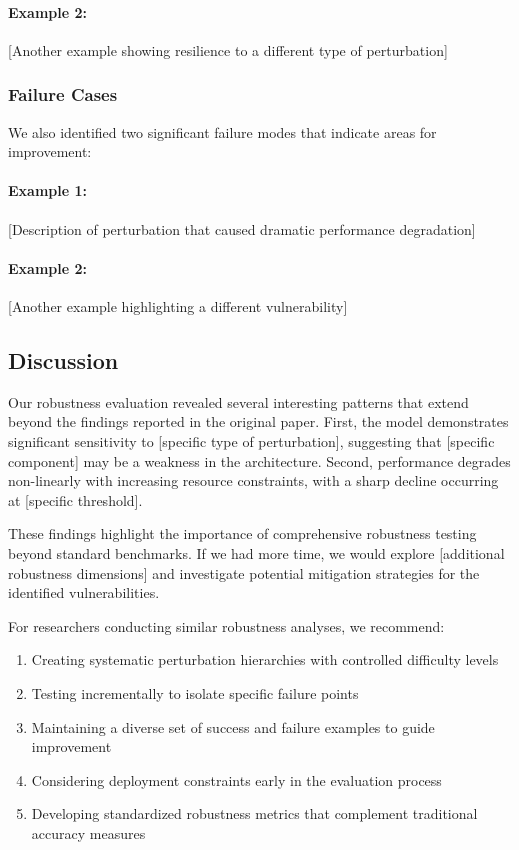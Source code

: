 \documentclass[11pt,a4paper]{article}
\begin{document}
\paragraph{Example 2:} [Another example showing resilience to a different type of perturbation]

\subsubsection{Failure Cases}

We also identified two significant failure modes that indicate areas for improvement:

\paragraph{Example 1:} [Description of perturbation that caused dramatic performance degradation]

\paragraph{Example 2:} [Another example highlighting a different vulnerability]

\subsection{Discussion}

Our robustness evaluation revealed several interesting patterns that extend beyond the findings reported in the original paper. First, the model demonstrates significant sensitivity to [specific type of perturbation], suggesting that [specific component] may be a weakness in the architecture. Second, performance degrades non-linearly with increasing resource constraints, with a sharp decline occurring at [specific threshold].

These findings highlight the importance of comprehensive robustness testing beyond standard benchmarks. If we had more time, we would explore [additional robustness dimensions] and investigate potential mitigation strategies for the identified vulnerabilities.

For researchers conducting similar robustness analyses, we recommend:
\begin{enumerate}
    \item Creating systematic perturbation hierarchies with controlled difficulty levels
    \item Testing incrementally to isolate specific failure points
    \item Maintaining a diverse set of success and failure examples to guide improvement
    \item Considering deployment constraints early in the evaluation process
    \item Developing standardized robustness metrics that complement traditional accuracy measures
\end{enumerate}
\end{document}
